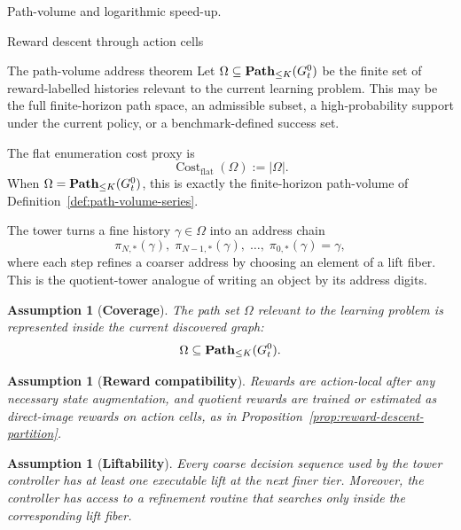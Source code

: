\documentclass[11pt]{article}
\newtheorem{assumption}[subsubsection]{Assumption}
\newcommand{\cost}{\operatorname{Cost}}
\begin{document}
\begin{section}{Path-volume and logarithmic speed-up.}
\begin{subsection}{Reward descent through action cells}
\end{subsection}

\begin{subsection}{The path-volume address theorem}
\label{thm:path-volume-address}
Let
$
\Omega\subseteq\bold{Path}_{\le K}(G_t^0)
$
be the finite set of reward-labelled histories relevant to the current learning problem. This may be the full finite-horizon path space, an admissible subset, a high-probability support under the current policy, or a benchmark-defined success set.

The flat enumeration cost proxy is
$$
\cost_{\mathrm{flat}}(\Omega):=|\Omega|.
$$
When $\Omega=\bold{Path}_{\le K}(G_t^0)$, this is exactly the finite-horizon path-volume of Definition~\ref{def:path-volume-series}.

The tower turns a fine history $\gamma\in\Omega$ into an address chain
$$
\pi_{N,*}(\gamma),\;
\pi_{N-1,*}(\gamma),\;
\ldots,\;
\pi_{0,*}(\gamma)=\gamma,
$$
where each step refines a coarser address by choosing an element of a lift fiber. This is the quotient-tower analogue of writing an object by its address digits.

\begin{assumption}[{\bf Coverage}]\label{ass:path-volume-coverage}
\normalfont
The path set $\Omega$ relevant to the learning problem is represented inside the current discovered graph:
$$
\Omega\subseteq\bold{Path}_{\le K}(G_t^0).
$$
\end{assumption}

\begin{assumption}[{\bf Reward compatibility}]\label{ass:path-volume-reward-compat}
\normalfont
Rewards are action-local after any necessary state augmentation, and quotient rewards are trained or estimated as direct-image rewards on action cells, as in Proposition~\ref{prop:reward-descent-partition}.
\end{assumption}

\begin{assumption}[{\bf Liftability}]\label{ass:path-volume-liftability}
\normalfont
Every coarse decision sequence used by the tower controller has at least one executable lift at the next finer tier. Moreover, the controller has access to a refinement routine that searches only inside the corresponding lift fiber.
\end{assumption}


\end{subsection}
\end{section}
\end{document}
